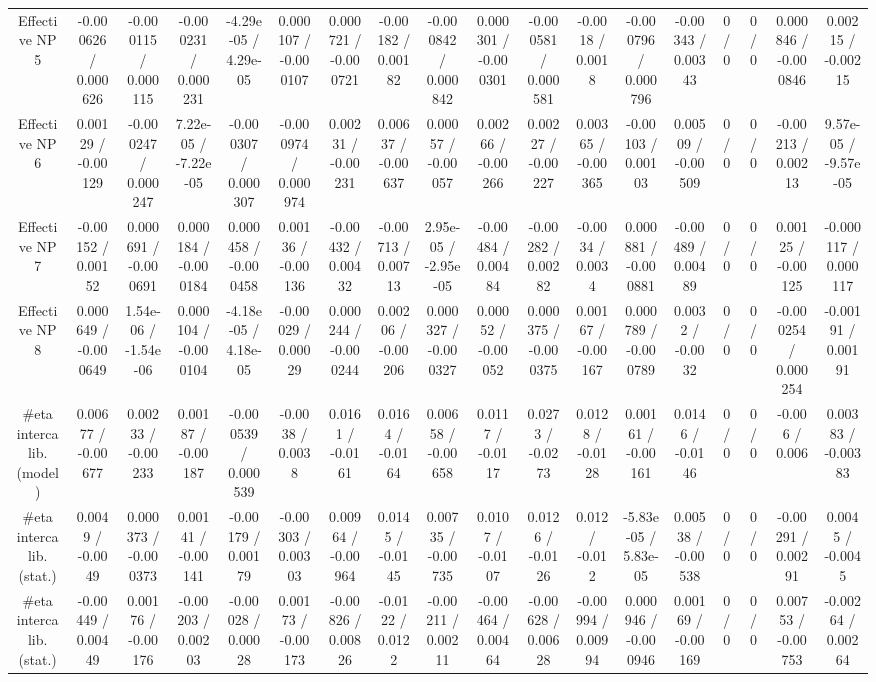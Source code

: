 \documentclass[10pt]{article}
\begin{document}
\begin{table}[htbp]
\begin{center}
\begin{tabular}{|c|c|c|c|c|c|c|c|c|c|c|c|c|c|c|c|c|c|}
  Effective NP 5 & -0.000626 / 0.000626 & -0.000115 / 0.000115 & -0.000231 / 0.000231 & -4.29e-05 / 4.29e-05 & 0.000107 / -0.000107 & 0.000721 / -0.000721 & -0.00182 / 0.00182 & -0.000842 / 0.000842 & 0.000301 / -0.000301 & -0.000581 / 0.000581 & -0.0018 / 0.0018 & -0.000796 / 0.000796 & -0.00343 / 0.00343 & 0 / 0 & 0 / 0 & 0.000846 / -0.000846 & 0.00215 / -0.00215 \\ 
  Effective NP 6 & 0.00129 / -0.00129 & -0.000247 / 0.000247 & 7.22e-05 / -7.22e-05 & -0.000307 / 0.000307 & -0.000974 / 0.000974 & 0.00231 / -0.00231 & 0.00637 / -0.00637 & 0.00057 / -0.00057 & 0.00266 / -0.00266 & 0.00227 / -0.00227 & 0.00365 / -0.00365 & -0.00103 / 0.00103 & 0.00509 / -0.00509 & 0 / 0 & 0 / 0 & -0.00213 / 0.00213 & 9.57e-05 / -9.57e-05 \\ 
  Effective NP 7 & -0.00152 / 0.00152 & 0.000691 / -0.000691 & 0.000184 / -0.000184 & 0.000458 / -0.000458 & 0.00136 / -0.00136 & -0.00432 / 0.00432 & -0.00713 / 0.00713 & 2.95e-05 / -2.95e-05 & -0.00484 / 0.00484 & -0.00282 / 0.00282 & -0.0034 / 0.0034 & 0.000881 / -0.000881 & -0.00489 / 0.00489 & 0 / 0 & 0 / 0 & 0.00125 / -0.00125 & -0.000117 / 0.000117 \\ 
  Effective NP 8 & 0.000649 / -0.000649 & 1.54e-06 / -1.54e-06 & 0.000104 / -0.000104 & -4.18e-05 / 4.18e-05 & -0.00029 / 0.00029 & 0.000244 / -0.000244 & 0.00206 / -0.00206 & 0.000327 / -0.000327 & 0.00052 / -0.00052 & 0.000375 / -0.000375 & 0.00167 / -0.00167 & 0.000789 / -0.000789 & 0.0032 / -0.0032 & 0 / 0 & 0 / 0 & -0.000254 / 0.000254 & -0.00191 / 0.00191 \\ 
  #eta intercalib. (model) & 0.00677 / -0.00677 & 0.00233 / -0.00233 & 0.00187 / -0.00187 & -0.000539 / 0.000539 & -0.0038 / 0.0038 & 0.0161 / -0.0161 & 0.0164 / -0.0164 & 0.00658 / -0.00658 & 0.0117 / -0.0117 & 0.0273 / -0.0273 & 0.0128 / -0.0128 & 0.00161 / -0.00161 & 0.0146 / -0.0146 & 0 / 0 & 0 / 0 & -0.006 / 0.006 & 0.00383 / -0.00383 \\ 
  #eta intercalib. (stat.) & 0.0049 / -0.0049 & 0.000373 / -0.000373 & 0.00141 / -0.00141 & -0.00179 / 0.00179 & -0.00303 / 0.00303 & 0.00964 / -0.00964 & 0.0145 / -0.0145 & 0.00735 / -0.00735 & 0.0107 / -0.0107 & 0.0126 / -0.0126 & 0.012 / -0.012 & -5.83e-05 / 5.83e-05 & 0.00538 / -0.00538 & 0 / 0 & 0 / 0 & -0.00291 / 0.00291 & 0.0045 / -0.0045 \\ 
  #eta intercalib. (stat.) & -0.00449 / 0.00449 & 0.00176 / -0.00176 & -0.00203 / 0.00203 & -0.00028 / 0.00028 & 0.00173 / -0.00173 & -0.00826 / 0.00826 & -0.0122 / 0.0122 & -0.00211 / 0.00211 & -0.00464 / 0.00464 & -0.00628 / 0.00628 & -0.00994 / 0.00994 & 0.000946 / -0.000946 & 0.00169 / -0.00169 & 0 / 0 & 0 / 0 & 0.00753 / -0.00753 & -0.00264 / 0.00264 \\ 

\end{tabular}
\end{center}
\end{table}
\end{document}
